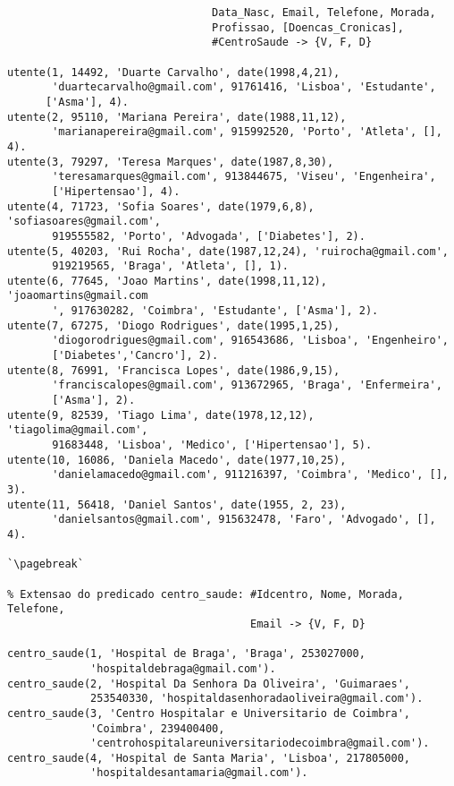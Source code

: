 \begin{lstlisting}[caption={Povoamento inicial da Base de Conhecimento com Conhecimento Perfeito Positivo}]
% Extensao do predicado utente: #Idutente, No Seguranca_Social, Nome,
                                Data_Nasc, Email, Telefone, Morada,
                                Profissao, [Doencas_Cronicas],
                                #CentroSaude -> {V, F, D}
                                
utente(1, 14492, 'Duarte Carvalho', date(1998,4,21),
       'duartecarvalho@gmail.com', 91761416, 'Lisboa', 'Estudante',
      ['Asma'], 4).
utente(2, 95110, 'Mariana Pereira', date(1988,11,12),
       'marianapereira@gmail.com', 915992520, 'Porto', 'Atleta', [], 4).      
utente(3, 79297, 'Teresa Marques', date(1987,8,30),
       'teresamarques@gmail.com', 913844675, 'Viseu', 'Engenheira',
       ['Hipertensao'], 4).      
utente(4, 71723, 'Sofia Soares', date(1979,6,8), 'sofiasoares@gmail.com',
       919555582, 'Porto', 'Advogada', ['Diabetes'], 2).      
utente(5, 40203, 'Rui Rocha', date(1987,12,24), 'ruirocha@gmail.com',
       919219565, 'Braga', 'Atleta', [], 1).      
utente(6, 77645, 'Joao Martins', date(1998,11,12), 'joaomartins@gmail.com
       ', 917630282, 'Coimbra', 'Estudante', ['Asma'], 2).      
utente(7, 67275, 'Diogo Rodrigues', date(1995,1,25),
       'diogorodrigues@gmail.com', 916543686, 'Lisboa', 'Engenheiro',
       ['Diabetes','Cancro'], 2).      
utente(8, 76991, 'Francisca Lopes', date(1986,9,15),
       'franciscalopes@gmail.com', 913672965, 'Braga', 'Enfermeira',
       ['Asma'], 2).
utente(9, 82539, 'Tiago Lima', date(1978,12,12), 'tiagolima@gmail.com',
       91683448, 'Lisboa', 'Medico', ['Hipertensao'], 5).      
utente(10, 16086, 'Daniela Macedo', date(1977,10,25),
       'danielamacedo@gmail.com', 911216397, 'Coimbra', 'Medico', [], 3).
utente(11, 56418, 'Daniel Santos', date(1955, 2, 23),
       'danielsantos@gmail.com', 915632478, 'Faro', 'Advogado', [], 4).
    
`\pagebreak`
       
% Extensao do predicado centro_saude: #Idcentro, Nome, Morada, Telefone,
                                      Email -> {V, F, D}
                                      
centro_saude(1, 'Hospital de Braga', 'Braga', 253027000,
             'hospitaldebraga@gmail.com').
centro_saude(2, 'Hospital Da Senhora Da Oliveira', 'Guimaraes',
             253540330, 'hospitaldasenhoradaoliveira@gmail.com').
centro_saude(3, 'Centro Hospitalar e Universitario de Coimbra',
             'Coimbra', 239400400,
             'centrohospitalareuniversitariodecoimbra@gmail.com').
centro_saude(4, 'Hospital de Santa Maria', 'Lisboa', 217805000,
             'hospitaldesantamaria@gmail.com').
             

\end{lstlisting}

